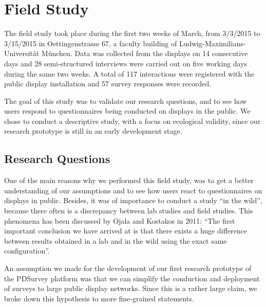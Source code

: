 \section{Field Study}
\label{chapter:field-study}


	The field study took place during the first two weeks of March, from 3/3/2015 to 3/15/2015 in Oettingenstrasse 67, a faculty building of Ludwig-Maximilians-Universit\"at M\"unchen. Data was collected from the displays on 14 consecutive days and 28 semi-structured interviews were carried out on five working days during the same two weeks. A total of 117 interactions were registered with the public display installation and 57 survey responses were recorded.

	The goal of this study was to validate our research questions, and to see how users respond to questionnaires being conducted on displays in the public. We chose to conduct a descriptive study, with a focus on ecological validity, since our research prototype is still in an early development stage. 




\subsection{Research Questions}

	One of the main reasons why we performed this field study, was to get a better understanding of our assumptions and to see how users react to questionnaires on displays in public. Besides, it was of importance to conduct a study ``in the wild'', because there often is a discrepancy between lab studies and field studies. This phenomena has been discussed by Ojala and Kostakos in 2011: ``The first important conclusion we have arrived at is that there exists a huge difference between results obtained in a lab and in the wild using the exact same configuration''\cite{Ojala2011}.

	An assumption we made for the development of our first research prototype of the PDSurvey platform was that we can simplify the conduction and deployment of surveys to large public display networks. Since this is a rather large claim, we broke down this hypothesis to more fine-grained statements. 


